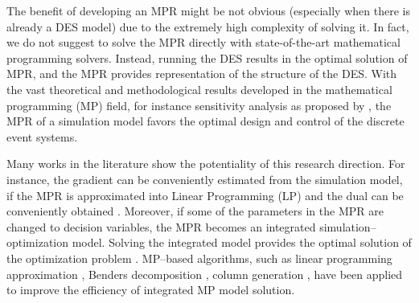 \documentclass[]{interact}
\theoremstyle{plain}%
\theoremstyle{definition}
\theoremstyle{remark}
\begin{document}
The benefit of developing an MPR might be not obvious (especially when there is already a DES model) due to the extremely high complexity of solving it. 
In fact, we do not suggest to solve the MPR directly with state-of-the-art mathematical programming solvers. Instead, running the DES results in the optimal solution of MPR, and the MPR provides representation of the structure of the DES. With the vast theoretical and methodological results developed in the mathematical programming (MP) field, for instance sensitivity analysis as proposed by \cite{chan2008optimization}, the MPR of a simulation model favors the optimal design and control of the discrete event systems. 


Many works in the literature show the potentiality of this research direction. For instance, the gradient can be conveniently estimated from the simulation model, if the MPR is approximated into Linear Programming (LP) and %
the dual can be conveniently obtained \citep{chan2008optimization, zhang2020simulation}. Moreover, if some of the parameters in the MPR are changed to decision variables, the MPR becomes an integrated simulation--optimization model. Solving the integrated model provides the optimal solution of the optimization problem \citep{matta2008simulation}. MP--based algorithms, such as linear programming approximation \citep{alfieri2012mathematical}, Benders decomposition \citep{weiss2015buffer}, column generation \citep{alfieri2020time}, have been applied to improve the efficiency of %
integrated MP model solution. 
\end{document}
